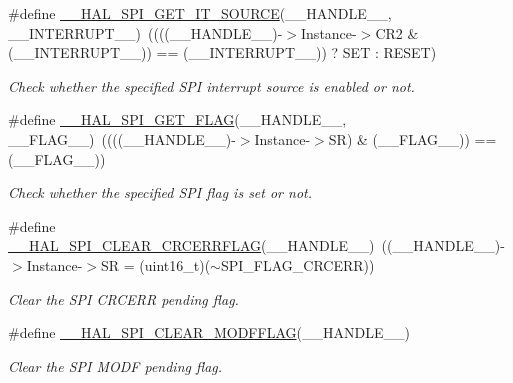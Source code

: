 \begin{DoxyCompactItemize}
\#define \mbox{\hyperlink{group___s_p_i___exported___macros_gabdaab061e4603331a0ec4b9d651df0b5}{\+\_\+\+\_\+\+H\+A\+L\+\_\+\+S\+P\+I\+\_\+\+G\+E\+T\+\_\+\+I\+T\+\_\+\+S\+O\+U\+R\+CE}}(\+\_\+\+\_\+\+H\+A\+N\+D\+L\+E\+\_\+\+\_\+,  \+\_\+\+\_\+\+I\+N\+T\+E\+R\+R\+U\+P\+T\+\_\+\+\_\+)~((((\+\_\+\+\_\+\+H\+A\+N\+D\+L\+E\+\_\+\+\_\+)-\/$>$Instance-\/$>$C\+R2 \& (\+\_\+\+\_\+\+I\+N\+T\+E\+R\+R\+U\+P\+T\+\_\+\+\_\+)) == (\+\_\+\+\_\+\+I\+N\+T\+E\+R\+R\+U\+P\+T\+\_\+\+\_\+)) ? S\+ET \+: R\+E\+S\+ET)
\begin{DoxyCompactList}\small\item\em Check whether the specified S\+PI interrupt source is enabled or not. \end{DoxyCompactList}\item 
\#define \mbox{\hyperlink{group___s_p_i___exported___macros_gaa0bbe5fb55f93fd277ddb6acf58cec53}{\+\_\+\+\_\+\+H\+A\+L\+\_\+\+S\+P\+I\+\_\+\+G\+E\+T\+\_\+\+F\+L\+AG}}(\+\_\+\+\_\+\+H\+A\+N\+D\+L\+E\+\_\+\+\_\+,  \+\_\+\+\_\+\+F\+L\+A\+G\+\_\+\+\_\+)~((((\+\_\+\+\_\+\+H\+A\+N\+D\+L\+E\+\_\+\+\_\+)-\/$>$Instance-\/$>$SR) \& (\+\_\+\+\_\+\+F\+L\+A\+G\+\_\+\+\_\+)) == (\+\_\+\+\_\+\+F\+L\+A\+G\+\_\+\+\_\+))
\begin{DoxyCompactList}\small\item\em Check whether the specified S\+PI flag is set or not. \end{DoxyCompactList}\item 
\#define \mbox{\hyperlink{group___s_p_i___exported___macros_gad1cb4100b67726531ad426d300f4cd26}{\+\_\+\+\_\+\+H\+A\+L\+\_\+\+S\+P\+I\+\_\+\+C\+L\+E\+A\+R\+\_\+\+C\+R\+C\+E\+R\+R\+F\+L\+AG}}(\+\_\+\+\_\+\+H\+A\+N\+D\+L\+E\+\_\+\+\_\+)~((\+\_\+\+\_\+\+H\+A\+N\+D\+L\+E\+\_\+\+\_\+)-\/$>$Instance-\/$>$SR = (uint16\+\_\+t)($\sim$S\+P\+I\+\_\+\+F\+L\+A\+G\+\_\+\+C\+R\+C\+E\+RR))
\begin{DoxyCompactList}\small\item\em Clear the S\+PI C\+R\+C\+E\+RR pending flag. \end{DoxyCompactList}\item 
\#define \mbox{\hyperlink{group___s_p_i___exported___macros_ga6c88becbe528c542156bc201622efba2}{\+\_\+\+\_\+\+H\+A\+L\+\_\+\+S\+P\+I\+\_\+\+C\+L\+E\+A\+R\+\_\+\+M\+O\+D\+F\+F\+L\+AG}}(\+\_\+\+\_\+\+H\+A\+N\+D\+L\+E\+\_\+\+\_\+)
\begin{DoxyCompactList}\small\item\em Clear the S\+PI M\+O\+DF pending flag. \end{DoxyCompactList}\item 

\end{DoxyCompactItemize}
